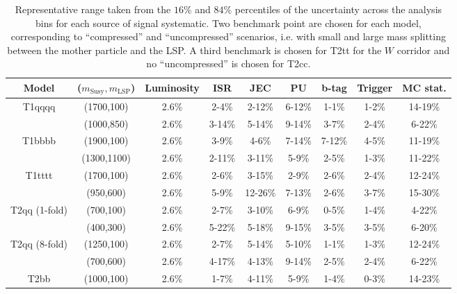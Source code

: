 \begin{table}[h!]
    \scriptsize
    \caption{
        Representative range taken from the $16\%$ and $84\%$ percentiles of the
        uncertainty across the analysis bins for each source of signal
        systematic. Two benchmark point are chosen for each model, corresponding
        to ``compressed'' and ``uncompressed'' scenarios, i.e. with small and
        large mass splitting between the mother particle and the LSP. A third
        benchmark is chosen for T2tt for the $W$ corridor and no
        ``uncompressed'' is chosen for T2cc.
    }
    \label{tab:sig-systematics-DM}
    \centering
    \begin{tabular}{ ccccccccc }
        \hline \hline
        Model & ($m_{\mathrm{Susy}},m_{\mathrm{LSP}}$) & Luminosity & ISR & JEC & PU & b-tag & Trigger & MC stat. \\ \hline
        \multirow{2}{*}{T1qqqq}
            & (1700,100) & 2.6\% & 2-4\%  & 2-12\% & 6-12\% & 1-1\% & 1-2\% & 14-19\% \\
            & (1000,850) & 2.6\% & 3-14\% & 5-14\% & 9-14\% & 3-7\% & 2-4\% & 6-22\%  \\
        \hline
        \multirow{2}{*}{T1bbbb}
            & (1900,100)  & 2.6\% & 3-9\%  & 4-6\%  & 7-14\% & 7-12\% & 4-5\% & 11-19\% \\
            & (1300,1100) & 2.6\% & 2-11\% & 3-11\% & 5-9\%  & 2-5\%  & 1-3\% & 11-22\% \\
        \hline
        \multirow{2}{*}{T1tttt}
            & (1700,100) & 2.6\% & 2-6\% & 3-15\%  & 2-9\%  & 2-6\% & 2-4\% & 12-24\% \\
            & (950,600)  & 2.6\% & 5-9\% & 12-26\% & 7-13\% & 2-6\% & 3-7\% & 15-30\% \\
        \hline
        \multirow{2}{*}{T2qq (1-fold)}
            & (700,100) & 2.6\% & 2-7\%  & 3-10\% & 6-9\%  & 0-5\% & 1-4\% & 4-22\% \\
            & (400,300) & 2.6\% & 5-22\% & 5-18\% & 9-15\% & 3-5\% & 3-5\% & 6-20\% \\
        \hline
        \multirow{2}{*}{T2qq (8-fold)}
            & (1250,100) & 2.6\% & 2-7\%  & 5-14\% & 5-10\% & 1-1\% & 1-3\% & 12-24\% \\
            & (700,600)  & 2.6\% & 4-17\% & 4-13\% & 9-14\% & 2-5\% & 2-4\% & 6-22\%  \\
        \hline
        \multirow{2}{*}{T2bb}
            & (1000,100) & 2.6\% & 1-7\%  & 4-11\% & 5-9\%  & 1-4\% & 0-3\% & 14-23\% \\

\end{tabular}
\end{table}
